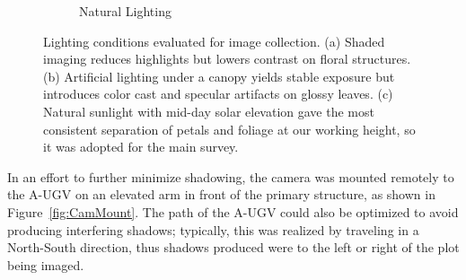 \begin{figure}[!ht]
\begin{subfigure}[b]{0.3\textwidth}
    \caption{Natural Lighting}
    \label{fig:NaturalLight}
  \end{subfigure}
  \caption{Lighting conditions evaluated for image collection. (a) Shaded imaging reduces highlights but lowers contrast on floral structures. (b) Artificial lighting under a canopy yields stable exposure but introduces color cast and specular artifacts on glossy leaves. (c) Natural sunlight with mid-day solar elevation gave the most consistent separation of petals and foliage at our working height, so it was adopted for the main survey.}

  \label{fig:LightComp}
\end{figure}
    
In an effort to further minimize shadowing, the camera was mounted remotely to the A-UGV on an elevated arm in front of the primary structure, as shown in Figure~\ref{fig:CamMount}. The path of the A-UGV could also be optimized to avoid producing interfering shadows; typically, this was realized by traveling in a North-South direction, thus shadows produced were to the left or right of the plot being imaged.

